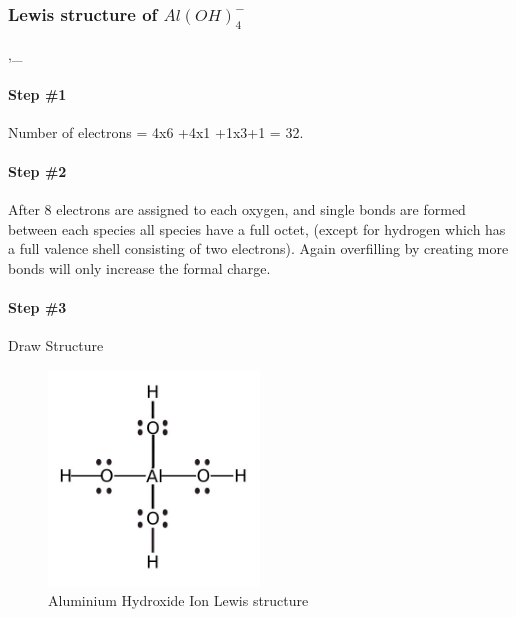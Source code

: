\documentclass[]{article}
\let\oldparagraph\paragraph
\renewcommand{\paragraph}[1]{\oldparagraph{#1}\mbox{}}
\begin{document}
\hypertarget{lewis-structure-of-aloh_4--}{%
\subsubsection{\texorpdfstring{Lewis structure of
\(Al(OH)_4 ^{-}\)}{Lewis structure of Al(OH)\_4 \^{}\{-\}}}\label{lewis-structure-of-aloh_4--}}

,\_

\hypertarget{step-1-1}{%
\paragraph{Step \#1}\label{step-1-1}}

Number of electrons = 4x6 +4x1 +1x3+1 = 32.

\hypertarget{step-2-1}{%
\paragraph{Step \#2}\label{step-2-1}}

After 8 electrons are assigned to each oxygen, and single bonds are
formed between each species all species have a full octet, (except for
hydrogen which has a full valence shell consisting of two electrons).
Again overfilling by creating more bonds will only increase the formal
charge.

\hypertarget{step-3-1}{%
\paragraph{Step \#3}\label{step-3-1}}

Draw Structure

\begin{figure}
\centering
\includegraphics[width=0.5\textwidth,height=\textheight]{Images/AluminiumHydroxideIonLewisStructure.jpg}
\caption{Aluminium Hydroxide Ion Lewis structure}
\end{figure}
\end{document}
